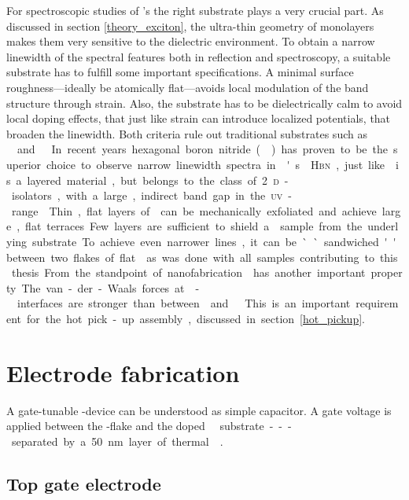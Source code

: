 For spectroscopic studies of \tmd's the right substrate plays a very crucial part. As discussed in section \ref{theory_exciton}, the ultra-thin geometry of \tmdg monolayers makes them very sensitive to the dielectric environment. To obtain a narrow linewidth of the spectral features both in reflection and \pl spectroscopy, a suitable substrate has to fulfill some important specifications. A minimal surface roughness---ideally be atomically flat---avoids local modulation of the band structure through strain. Also, the substrate has to be dielectrically calm to avoid local doping effects, that just like strain can introduce localized potentials, that broaden the linewidth. Both criteria rule out traditional substrates such as \si\ and \sio\!. In recent years hexagonal boron nitride (\hbn) has proven to be the superior choice to observe narrow linewidth spectra in \tmd's\cite{courtade_spectrally_2018}. \textsc{Hbn}, just like \tmds is a layered material, but belongs to the class of 2\textsc{d}-isolators, with a large, indirect band gap in the \textsc{uv}-range\cite{arnaud_huge_2006}. Thin, flat layers of \hbng can be mechanically exfoliated and achieve large, flat terraces. Few layers are sufficient to shield a \tmdg sample from the underlying substrate. To achieve even narrower lines, it can be ``sandwiched'' between two flakes of flat \hbng as was done with all samples contributing to this thesis. From the standpoint of nanofabrication \hbng has another important property. The van-der-Waals forces at \hbn-\tmdg interfaces are stronger than between \tmds and \sio\!. This is an important requirement for the hot pick-up assembly, discussed in section \ref{hot_pickup}.

\section{Electrode fabrication}

A gate-tunable \tmd-device can be understood as simple capacitor. A gate voltage is applied between the \tmd-flake and the doped \si\ substrate---separated by a 50 nm layer of thermal \sio\!.

\subsection{Top gate electrode}

